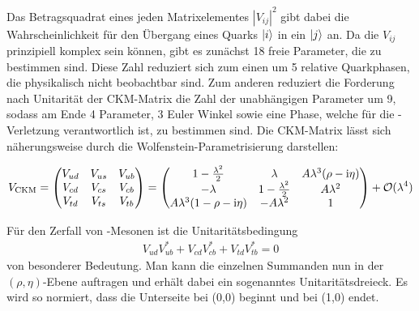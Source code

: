 Das Betragsquadrat eines jeden Matrixelementes $|V_{ij}|^2$ gibt dabei die Wahrscheinlichkeit für den Übergang eines Quarks $\Ket{i}$ in ein $\Ket{j}$ an. Da die $V_{ij}$ prinzipiell komplex sein können, gibt es zunächst 18 freie Parameter, die zu bestimmen sind. Diese Zahl reduziert sich zum einen um 5 relative Quarkphasen, die physikalisch nicht beobachtbar sind. Zum anderen reduziert die Forderung nach Unitarität der CKM-Matrix die Zahl der unabhängigen Parameter um 9, sodass am Ende 4 Parameter, 3 Euler Winkel sowie eine Phase, welche für die \CP-Verletzung verantwortlich ist, zu bestimmen sind. Die CKM-Matrix lässt sich näherungsweise durch die Wolfenstein-Parametrisierung darstellen:

\begin{align}
V_{\text{CKM}}=
\begin{pmatrix}
V_{ud} & V_{us} & V_{ub} \\
V_{cd} & V_{cs} & V_{cb} \\
V_{td} & V_{ts} & V_{tb} \\
\end{pmatrix}
=
\begin{pmatrix}
1-\frac{\lambda^2}{2} & \lambda & A\lambda^3(\rho-\mathrm{i}\eta) \\
-\lambda & 1-\frac{\lambda^2}{2} & A\lambda^2 \\
A\lambda^3(1-\rho-\mathrm{i}\eta) & -A\lambda^2 & 1
\end{pmatrix}
+ \mathcal{O}(\lambda^4)
\end{align}

Für den Zerfall von \Bd-Mesonen ist die Unitaritätsbedingung
\begin{align}
V_{ud}V_{ub}^* + V_{cd}V_{cb}^* + V_{td}V_{tb}^* = 0
\end{align}
von besonderer Bedeutung. Man kann die einzelnen Summanden nun in der $(\rho,\eta)$-Ebene auftragen und erhält dabei ein sogenanntes Unitaritätsdreieck. Es wird so normiert, dass die Unterseite bei (0,0) beginnt und bei (1,0) endet.